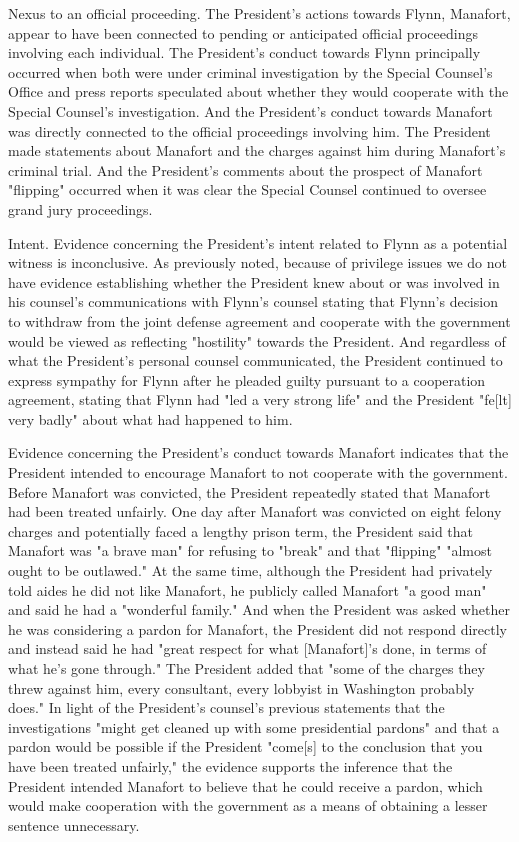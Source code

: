{

Nexus to an official proceeding.
The President's actions towards Flynn, Manafort, appear to have been connected to pending or anticipated official proceedings involving each individual.
The President's conduct towards Flynn principally occurred when both were under criminal investigation by the Special Counsel's Office and press reports speculated about whether they would cooperate with the Special Counsel's investigation.
And the President's conduct towards Manafort was directly connected to the official proceedings involving him.
The President made statements about Manafort and the charges against him during Manafort's criminal trial.
And the President's comments about the prospect of Manafort "flipping" occurred when it was clear the Special Counsel continued to oversee grand jury proceedings.

Intent.
Evidence concerning the President's intent related to Flynn as a potential witness is inconclusive.
As previously noted, because of privilege issues we do not have evidence establishing whether the President knew about or was involved in his counsel's communications with Flynn's counsel stating that Flynn's decision to withdraw from the joint defense agreement and cooperate with the government would be viewed as reflecting "hostility" towards the President.
And regardless of what the President's personal counsel communicated, the President continued to express sympathy for Flynn after he pleaded guilty pursuant to a cooperation agreement, stating that Flynn had "led a very strong life" and the President "fe[lt] very badly" about what had happened to him.

Evidence concerning the President's conduct towards Manafort indicates that the President intended to encourage Manafort to not cooperate with the government.
Before Manafort was convicted, the President repeatedly stated that Manafort had been treated unfairly.
One day after Manafort was convicted on eight felony charges and potentially faced a lengthy prison term, the President said that Manafort was "a brave man" for refusing to "break" and that "flipping" "almost ought to be outlawed."
At the same time, although the President had privately told aides he did not like Manafort, he publicly called Manafort "a good man" and said he had a "wonderful family."
And when the President was asked whether he was considering a pardon for Manafort, the President did not respond directly and instead said he had "great respect for what [Manafort]'s done, in terms of what he's gone through."
The President added that "some of the charges they threw against him, every consultant, every lobbyist in Washington probably does."
In light of the President's counsel's previous statements that the investigations "might get cleaned up with some presidential pardons" and that a pardon would be possible if the President "come[s] to the conclusion that you have been treated unfairly," the evidence supports the inference that the President intended Manafort to believe that he could receive a pardon, which would make cooperation with the government as a means of obtaining a lesser sentence unnecessary.

}
